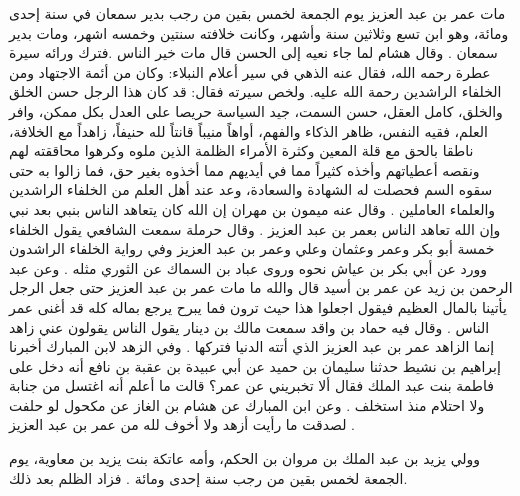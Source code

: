 مات عمر بن عبد العزيز يوم الجمعة لخمس بقين من رجب بدير سمعان في سنة إحدى ومائة، وهو ابن تسع وثلاثين سنة وأشهر، وكانت خلافته سنتين وخمسه اشهر، ومات بدير سمعان \cite{ibnJareerTabari_Tareekh}. وقال هشام لما جاء نعيه إلى الحسن قال مات خير الناس \cite{dahabi_Siyar}.فترك ورائه سيرة عطرة رحمه الله، فقال عنه الذهي في سير أعلام النبلاء: وكان من أئمة الاجتهاد ومن الخلفاء الراشدين رحمة الله عليه. ولخص سيرته فقال: قد كان هذا الرجل حسن الخلق والخلق، كامل العقل، حسن السمت، جيد السياسة حريصا على العدل بكل ممكن، وافر العلم، فقيه النفس، ظاهر الذكاء والفهم، أواهاً منيباً قانتاً لله حنيفاً، زاهداً مع الخلافة، ناطقا بالحق مع قلة المعين وكثرة الأمراء الظلمة الذين ملوه وكرهوا محاققته لهم ونقصه أعطياتهم وأخذه كثيراً مما في أيديهم مما أخذوه بغير حق، فما زالوا به حتى سقوه السم فحصلت له الشهادة والسعادة، وعد عند أهل العلم من الخلفاء الراشدين والعلماء العاملين \cite{dahabi_Siyar}. وقال عنه ميمون بن مهران إن الله كان يتعاهد الناس بنبي بعد نبي وإن الله تعاهد الناس بعمر بن عبد العزيز \cite{dahabi_Siyar}. وقال حرملة سمعت الشافعي يقول الخلفاء خمسة أبو بكر وعمر وعثمان وعلي وعمر بن عبد العزيز وفي رواية الخلفاء الراشدون وورد عن أبي بكر بن عياش نحوه وروى عباد بن السماك عن الثوري مثله \cite{dahabi_Siyar}. وعن عبد الرحمن بن زيد عن عمر بن أسيد قال والله ما مات عمر بن عبد العزيز حتى جعل الرجل يأتينا بالمال العظيم فيقول اجعلوا هذا حيث ترون فما يبرح يرجع بماله كله قد أغنى عمر الناس \cite{dahabi_Siyar}. وقال فيه حماد بن واقد سمعت مالك بن دينار يقول الناس يقولون عني زاهد إنما الزاهد عمر بن عبد العزيز الذي أتته الدنيا فتركها \cite{dahabi_Siyar}. وفي الزهد لابن المبارك أخبرنا إبراهيم بن نشيط حدثنا سليمان بن حميد عن أبي عبيدة بن عقبة بن نافع أنه دخل على فاطمة بنت عبد الملك فقال ألا تخبريني عن عمر؟ قالت ما أعلم أنه اغتسل من جنابة ولا احتلام منذ استخلف \cite{dahabi_Siyar}. وعن ابن المبارك عن هشام بن الغاز عن مكحول لو حلفت لصدقت ما رأيت أزهد ولا أخوف لله من عمر بن عبد العزيز \cite{dahabi_Siyar}.

وولي يزيد بن عبد الملك بن مروان بن الحكم، وأمه عاتكة بنت يزيد بن معاوية، يوم الجمعة لخمس بقين من رجب سنة إحدى ومائة \cite{ibnAbdRabbih_AlIqd}. فزاد الظلم بعد ذلك. 

